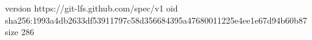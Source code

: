 version https://git-lfs.github.com/spec/v1
oid sha256:1993a4db2633df53911797c58d356684395a47680011225e4ee1e67d94b60b87
size 286
